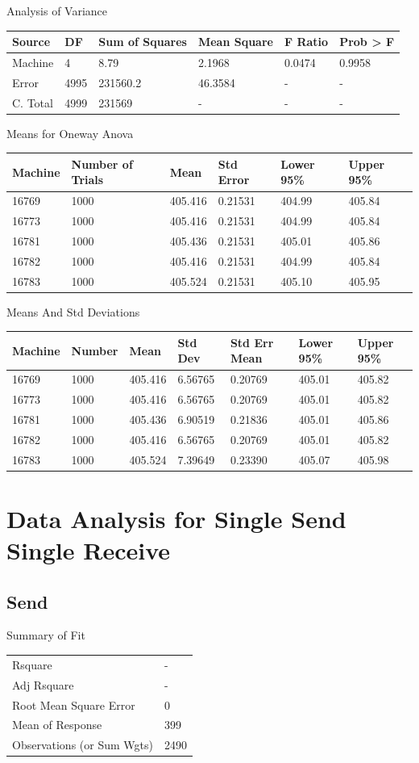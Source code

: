 \documentclass[12pt,twocolumn]{report}
\begin{document}
Analysis of Variance
\newline
\begin{tabular}{l | l | l | l | l | l}
  Source&DF&Sum of Squares&Mean Square&F Ratio&Prob > F \\
  \hline
  Machine&4&8.79&2.1968&0.0474&0.9958 \\
  Error&4995&231560.2&46.3584&-&- \\
  C. Total&4999&231569&-&-&- \\
\end{tabular}
\newline

Means for Oneway Anova
\newline
\begin{tabular}{l | l | l | l | l | l}
  Machine&Number of Trials&Mean&Std Error&Lower 95\%&Upper 95\% \\
  \hline
  16769&1000&405.416&0.21531&404.99&405.84 \\
  16773&1000&405.416&0.21531&404.99&405.84 \\
  16781&1000&405.436&0.21531&405.01&405.86 \\
  16782&1000&405.416&0.21531&404.99&405.84 \\
  16783&1000&405.524&0.21531&405.10&405.95 \\
\end{tabular}
\newline

Means And Std Deviations
\newline
\begin{tabular}{l | l | l | l | l | l |l}
  Machine&Number&Mean&Std Dev&Std Err Mean&Lower 95\%&Upper 95\% \\
  \hline
  16769&1000&405.416&6.56765&0.20769&405.01&405.82 \\
  16773&1000&405.416&6.56765&0.20769&405.01&405.82 \\
  16781&1000&405.436&6.90519&0.21836&405.01&405.86 \\
  16782&1000&405.416&6.56765&0.20769&405.01&405.82 \\
  16783&1000&405.524&7.39649&0.23390&405.07&405.98 \\
\end{tabular}
\newline

\section{Data Analysis for Single Send Single Receive}
\subsection{Send}
Summary of Fit
\newline
\begin{tabular}{l | l}
  Rsquare&- \\
  Adj Rsquare&- \\
  Root Mean Square Error&0 \\
  Mean of Response&399 \\
  Observations (or Sum Wgts)&2490 \\
\end{tabular}
\newline
\end{document}
